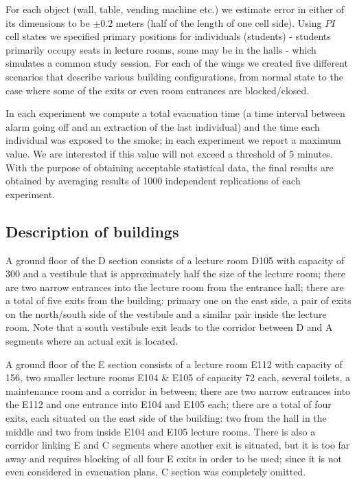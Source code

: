 For each object (wall, table, vending machine etc.) we estimate error in either
of its dimensions to be $\pm$0.2 meters (half of the length of one cell side).
Using $PI$ cell states we specified primary positions for individuals
(students) - students primarily occupy seats in lecture rooms, some may be in
the halls - which simulates a common study session.
For each of the wings we created five different scenarios that describe
various building configurations, from normal state to the case where some of
the exits or even room entrances are blocked/closed.

In each experiment we compute a total evacuation time (a time interval between
alarm going off and an extraction of the last individual) and the time each
individual was exposed to the smoke;
in each experiment we report a maximum value.
We are interested if this value will not exceed a threshold of 5 minutes.
With the purpose of obtaining acceptable statistical data, the final results are
obtained by averaging results of 1000 independent replications of each
experiment.

\subsection{Description of buildings}
A ground floor of the D section consists of a lecture room D105 with capacity of
300 and a vestibule that is approximately half the size of the lecture room;
there are two narrow entrances into the lecture room from the entrance hall;
there are a total of five exits from the building: primary one on the east
side, a pair of exits on the north/south side of the vestibule and a similar
pair inside the lecture room.
Note that a south vestibule exit leads to the corridor between D and A segments
where an actual exit is located.

A ground floor of the E section consists of a lecture room E112 with capacity of
156, two smaller lecture rooms E104 \& E105 of capacity 72 each, several toilets,
a maintenance room and a corridor in between;
there are two narrow entrances into the E112 and one entrance into E104 and
E105 each;
there are a total of four exits, each situated on the east side of the building:
two from the hall in the middle and two from inside E104 and E105 lecture rooms.
There is also a corridor linking E and C segments where another exit is
situated, but it is too far away and requires blocking of all four E exits in
order to be used; since it is not even considered in evacuation plans, C section
was completely omitted.


